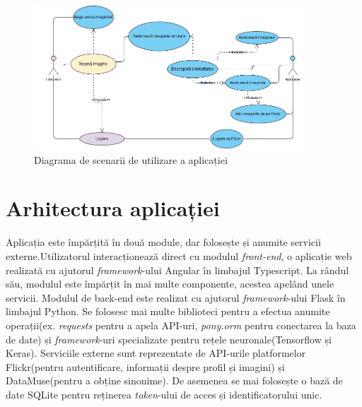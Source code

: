  \begin{figure}[!htbp]
    \begin{center}
        \includegraphics[width=0.9\textwidth]{images/use_case.png}
        \caption{Diagrama de scenarii de utilizare a aplicației}
    \end{center}
\end{figure}


\section{Arhitectura aplicației}
Aplicația este împărțită în două module, dar folosește și anumite servicii externe.Utilizatorul interacționează direct cu modulul  \textit{front-end}, o aplicație web realizată cu ajutorul \textit{framework}-ului Angular în limbajul Typescript. La rândul său, modulul este împărțit în mai multe componente, acestea apelând unele servicii. Modulul de back-end este realizat cu ajutorul \textit{framework}-ului Flask în limbajul Python. Se folosesc mai multe biblioteci pentru a efectua anumite operații(ex. \textit{requests} pentru a apela API-uri, \textit{pony.orm} pentru conectarea la baza de date) și \textit{framework}-uri specializate pentru rețele neuronale(Tensorflow și Keras). Serviciile externe sunt reprezentate de API-urile platformelor Flickr(pentru autentificare, informații despre profil și imagini) și DataMuse(pentru a obține sinonime). De asemenea se mai folosește o bază de date SQLite pentru reținerea \textit{token}-ului de acces și identificatorului unic.

